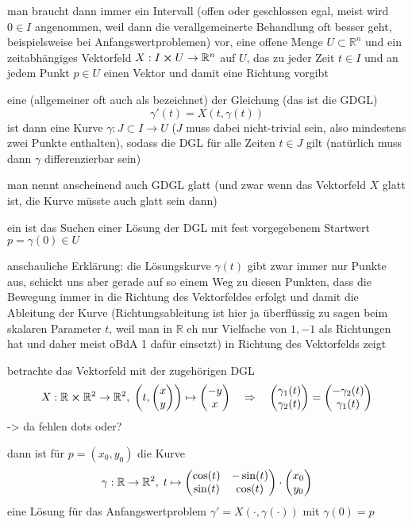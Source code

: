 \documentclass[../H_Analysis_main.tex]{subfiles}
\begin{document}
man braucht dann immer ein Intervall (offen oder geschlossen egal, meist wird $0 \in I$ angenommen, weil dann die verallgemeinerte Behandlung oft besser geht, beispielsweise bei Anfangswertproblemen) vor, eine offene Menge $U \subset \mathbb{R}^n$ und ein zeitabhängiges Vektorfeld $X: I \cross U \rightarrow \mathbb{R}^n$ auf $U$, das zu jeder Zeit $t \in I$ und an jedem Punkt $p \in U$ einen Vektor und damit eine Richtung vorgibt

eine  (allgemeiner oft auch als  bezeichnet) der Gleichung (das ist die GDGL)
\begin{equation}
\gamma'(t) = X(t, \gamma(t))
\end{equation}
ist dann eine Kurve $\gamma: J \subset I \rightarrow U$ ($J$ muss dabei nicht-trivial sein, also mindestens zwei Punkte enthalten), sodass die DGL für alle Zeiten $t \in J$ gilt (natürlich muss dann $\gamma$ differenzierbar sein)

man nennt anscheinend auch GDGL glatt (und zwar wenn das Vektorfeld $X$ glatt ist, die Kurve müsste auch glatt sein dann)

ein  ist das Suchen einer Lösung der DGL mit fest vorgegebenem Startwert $p = \gamma(0) \in U$


anschauliche Erklärung: die Lösungskurve $\gamma(t)$ gibt zwar immer nur Punkte aus, schickt uns aber gerade auf so einem Weg zu diesen Punkten, dass die Bewegung immer in die Richtung des Vektorfeldes erfolgt und damit die Ableitung der Kurve (Richtungsableitung ist hier ja überflüssig zu sagen beim skalaren Parameter $t$, weil man in $\mathbb{R}$ eh nur Vielfache von $1, -1$ als Richtungen hat und daher meist oBdA 1 dafür einsetzt) in Richtung des Vektorfelds zeigt


\begin{bsp}
betrachte das Vektorfeld mit der zugehörigen DGL
\begin{equation}
X: \mathbb{R} \cross \mathbb{R}^2 \rightarrow \mathbb{R}^2, \; \qty(t, \mqty(x \\ y)) \mapsto \mqty(-y \\ x) \quad \Rightarrow \quad \mqty(\gamma_1(t) \\ \gamma_2(t)) = \mqty(- \gamma_2(t) \\ \gamma_1(t))
\end{equation}
-> da fehlen dots oder?

dann ist für $p = (x_0, y_0)$ die Kurve
\begin{equation}
\gamma: \mathbb{R} \rightarrow \mathbb{R}^2, \; t \mapsto \mqty(\cos(t) & -\sin(t) \\ \sin(t) & \cos(t)) \cdot \mqty(x_0 \\ y_0)
\end{equation}
eine Lösung für das Anfangswertproblem $\gamma' = X(\cdot, \gamma(\cdot))$ mit $\gamma(0) = p$
\end{bsp}
\end{document}

